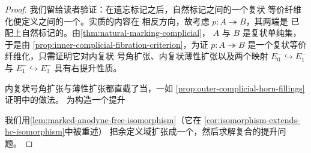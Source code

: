 \begin{proof}
我们留给读者验证：在遗忘标记之后，自然标记\trQuasiCategory{}之间的一个复状
等价纤维化便定义\trQuasiCategory{}之间的一个\trIsofibration。实质的内容在
相反方向，故考虑\trIsofibration{} $p\colon A\twoheadrightarrow B$，其两端是
已配上自然标记的\trQuasiCategory。由\cref{thm:natural-marking-complicial}，
\trQuasiCategory{} $A$ 与 $B$ 是复状单纯集，于是由%
\cref{prop:inner-complicial-fibration-criterion}，为证
$p\colon A\twoheadrightarrow B$ 是一个复状等价纤维化，只需证明它对内复状
号角扩张、内复状薄性扩张以及两个映射
$E_{0}^{-}\hookrightarrow E_{1}^{-}$ 与
$E_{1}^{-}\hookrightarrow E_{3}^{-}$ 具有右提升性质。

内复状号角扩张与薄性扩张都直截了当，一如%
\cref{prop:outer-complicial-horn-fillings}证明中的做法。
为构造一个提升
\begin{center}
\end{center}
我们用\cref{lem:marked-anodyne-free-isomorphism}（它在%
\cref{cor:isomorphism-extends-hc-isomorphism}中被重述）
把余定义域扩张成一个\trHomotopyCoherentIsomorphism，然后求解复合的提升问题。


\end{proof}
